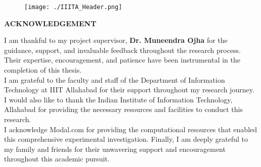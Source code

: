\newpage

\begin{figure}[htp]
    \texttt{[image: ./IIITA\_Header.png]}
\end{figure}
\thispagestyle{empty}
\vspace{1mm}

\begin{center}
    {\large\bfseries ACKNOWLEDGEMENT}
\end{center}

\begin{spacing}{1.5}
I am thankful to my project supervisor, \textbf{Dr. Muneendra Ojha} for the guidance, support, and invaluable feedback throughout the research process. Their expertise, encouragement, and patience have been instrumental in the completion of this thesis.\\[10pt] 

I am grateful to the faculty and staff of the Department of Information Technology at IIIT Allahabad for their support throughout my research journey. I would also like to thank the Indian Institute of Information Technology, Allahabad for providing the necessary resources and facilities to conduct this research.\\[10pt]

I acknowledge Modal.com for providing the computational resources that enabled this comprehensive experimental investigation. Finally, I am deeply grateful to my family and friends for their unwavering support and encouragement throughout this academic pursuit. \\[30 pt]
\end{spacing}

\begin{spacing}{2.0}
\begin{flushright}
    \begin{minipage}{0.5\textwidth}
        \flushright \vspace{60 pt}
        \underline{\hspace{6cm}} \\
         \\[80pt]
    \end{minipage}
\end{flushright}
\end{spacing}
\newpage

